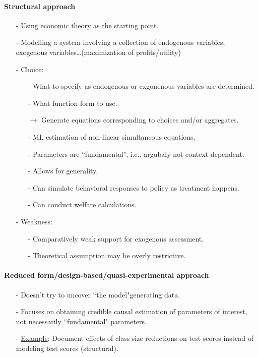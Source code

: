 \documentclass[a4paper,11pt]{article}
\begin{document}
\paragraph{Structural approach}
	\begin{itemize}
		\item[-] Using economic theory as the starting point.
		\item[-] Modelling a system involving a collection of endogenous variables, exogenous variables\ldots (maximization of profits/utility)
		\item[-] Choice:
		\begin{itemize}
			\item[-] What to specify as endogenous or exgonenous variables are determined.
			\item[-] What function form to use.
			\item[$\rightarrow$] Generate equations corresponding to choices and/or aggregates.
			\item[-] ML estimation of non-linear simultaneous equations.
			\item[-] Parameters are ``fundamental", i.e., argubaly not context dependent.
			\item[-] Allows for generality.
			\item[-] Can simulate behavioral responses to policy as treatment happens.
			\item[-] Can conduct welfare calculations.
		\end{itemize}
		\item[-] Weakness:
		\begin{itemize}
			\item[-] Comparatively weak support for exogenous assessment.
			\item[-] Theoretical assumption may be overly restrictive.
		\end{itemize}
	\end{itemize}
\paragraph{Reduced form/design-based/quasi-experimental approach}
\begin{itemize}
	\item[-]Doesn't try to uncover ``the model"generating data.
	\item[-]Focuses on obtaining credible causal estimation of parameters of interest, not necessarily ``fundamental" parameters.
	\item[-]\underline{Example}: Document effects of class size reductions on test scores instead of modeling test scores (structural).
\end{itemize}
\end{document}
